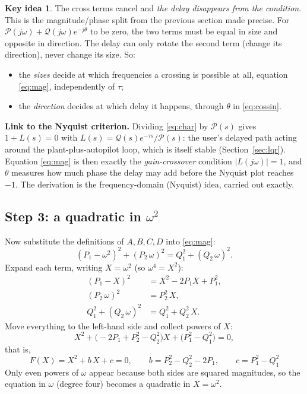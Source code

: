 \documentclass[11pt,a4paper]{article}
\theoremstyle{definition}
\newtheorem*{idea}{Key idea}
\begin{document}
\begin{idea}
The cross terms cancel and \emph{the delay disappears from the
condition}. This is the magnitude/phase split from the previous section
made precise. For $\mathcal{P}(j\omega) + \mathcal{Q}(j\omega)e^{-j\theta}$
to be zero, the two terms must be equal in size and opposite in
direction. The delay can only rotate the second term (change its
direction), never change its size. So:
\begin{itemize}\setlength{\itemsep}{0pt}
\item the \emph{sizes} decide at which frequencies a crossing is
possible at all, equation \eqref{eq:mag}, independently of $\tau$;
\item the \emph{direction} decides at which delay it happens, through
$\theta$ in \eqref{eq:cossin}.
\end{itemize}
\end{idea}

\textbf{Link to the Nyquist criterion.} Dividing \eqref{eq:char} by
$\mathcal{P}(s)$ gives $1 + L(s) = 0$ with
$L(s) = \mathcal{Q}(s)e^{-\tau s}/\mathcal{P}(s)$: the user's delayed
path acting around the plant-plus-autopilot loop, which is itself
stable (Section~\ref{sec:lqr}). Equation \eqref{eq:mag} is then exactly
the \emph{gain-crossover} condition $|L(j\omega)| = 1$, and $\theta$
measures how much phase the delay may add before the Nyquist plot
reaches $-1$. The derivation is the frequency-domain (Nyquist) idea,
carried out exactly.

\subsection{Step 3: a quadratic in \texorpdfstring{$\omega^2$}{omega squared}}
Now substitute the definitions of $A, B, C, D$ into \eqref{eq:mag}:
\[
(P_1 - \omega^2)^2 + (P_2\,\omega)^2 = Q_1^2 + (Q_2\,\omega)^2 .
\]
Expand each term, writing $X = \omega^2$ (so $\omega^4 = X^2$):
\begin{align*}
(P_1 - X)^2 &= X^2 - 2P_1X + P_1^2,\\
(P_2\,\omega)^2 &= P_2^2\,X,\\
Q_1^2 + (Q_2\,\omega)^2 &= Q_1^2 + Q_2^2\,X .
\end{align*}
Move everything to the left-hand side and collect powers of $X$:
\[
X^2 + \bigl(-2P_1 + P_2^2 - Q_2^2\bigr)X + \bigl(P_1^2 - Q_1^2\bigr) = 0,
\]
that is,
\begin{equation}
\boxed{\;F(X) = X^{2} + b\,X + c = 0,\qquad
b = P_2^{2} - Q_2^{2} - 2P_1,\qquad
c = P_1^{2} - Q_1^{2}\;}
\label{eq:quad}
\end{equation}
Only even powers of $\omega$ appear because both sides are squared
magnitudes, so the equation in $\omega$ (degree four) becomes a
quadratic in $X = \omega^2$.
\end{document}
